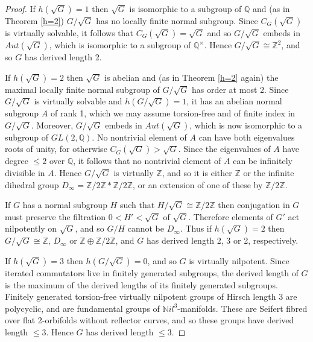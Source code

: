 \documentclass[12pt]{amsart}
\renewcommand{\leq}{\leqslant}
\begin{document}
\begin{proof}
If $h(\sqrt{G})=1$ then $\sqrt{G}$ is isomorphic to a subgroup of $\mathbb{Q}$ 
and (as in Theorem \ref{h=2}) $G/\sqrt{G}$ has no locally finite normal subgroup.
Since $C_G(\sqrt{G})$ is virtually solvable,
it follows that $C_G(\sqrt{G})=\sqrt{G}$ and so 
$G/\sqrt{G}$ embeds in $Aut(\sqrt{G})$, 
which is isomorphic to a subgroup of $\mathbb{Q}^\times$.
Hence $G/\sqrt{G}\cong\mathbb{Z}^2$,
and so $G$ has derived length 2.

If $h(\sqrt{G})=2$ then $\sqrt{G}$ is abelian and (as in Theorem \ref{h=2} again)
the maximal locally finite normal subgroup of $G/\sqrt{G}$ has order at most 2.
Since $G/\sqrt{G}$ is virtually solvable  and $h(G/\sqrt{G})=1$,
it has an abelian normal subgroup $A$ of rank 1,
which we may assume torsion-free and of finite index in $G/\sqrt{G}$.
Moreover, $G/\sqrt{G}$ embeds in $Aut(\sqrt{G})$, 
which is now isomorphic to a subgroup of $GL(2,\mathbb{Q})$.
No nontrivial element of $A$ can have both eigenvalues roots of unity,
for otherwise $C_G(\sqrt{G})>\sqrt{G}$.
Since the eigenvalues of $A$ have degree $\leq2$ over $\mathbb{Q}$,
it follows that no nontrivial element of $A$ can be infinitely divisible in $A$.
Hence $G/\sqrt{G}$ is virtually $\mathbb{Z}$, 
and so it is either $\mathbb{Z}$ or the infinite dihedral group 
$D_\infty=\mathbb{Z}/2\mathbb{Z}*\mathbb{Z}/2\mathbb{Z}$,
or an extension of one of these by $\mathbb{Z}/2\mathbb{Z}$.

If $G$ has a normal subgroup $H$ such that 
$H/\sqrt{G}\cong\mathbb{Z}/2\mathbb{Z}$ then conjugation in $G$ 
must preserve the filtration $0<H'<\sqrt{G}$ of $\sqrt{G}$.
Therefore elements of $G'$ act nilpotently on $\sqrt{G}$,
and so $G/H$ cannot be $D_\infty$.
Thus if $h(\sqrt{G})=2$ then $G/\sqrt{G}\cong\mathbb{Z}$, 
$D_\infty$ or $\mathbb{Z}\oplus\mathbb{Z}/2\mathbb{Z}$,
and $G$ has derived length 2, 3 or 2, respectively.

If $h(\sqrt{G})=3$ then $h(G/\sqrt{G})=0$, and so $G$ is virtually nilpotent.
Since iterated commutators live in finitely generated subgroups, 
the derived length of $G$ is the maximum of the derived lengths of its finitely generated subgroups.
Finitely generated torsion-free virtually nilpotent groups of Hirsch length 3
are polycyclic, and are fundamental groups of $\mathbb{N}il^3$-manifolds.
These are Seifert fibred over flat 2-orbifolds without reflector curves,
and so these groups have derived length $\leq3$.
Hence $G$ has derived length $\leq3$.
\end{proof}
\end{document}
